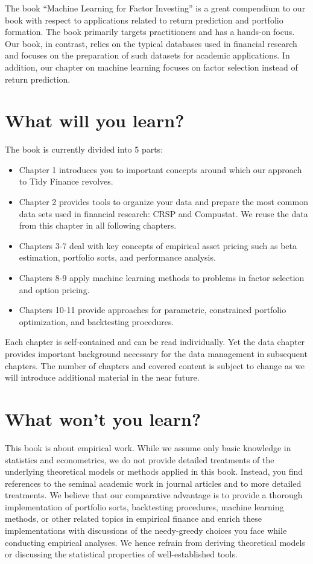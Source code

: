 \documentclass[
]{krantz}
\providecommand{\tightlist}{%
  \setlength{\itemsep}{0pt}\setlength{\parskip}{0pt}}
\begin{document}
The book ``Machine Learning for Factor Investing'' is a great compendium to our book with respect to applications related to return prediction and portfolio formation. The book primarily targets practitioners and has a hands-on focus. Our book, in contrast, relies on the typical databases used in financial research and focuses on the preparation of such datasets for academic applications. In addition, our chapter on machine learning focuses on factor selection instead of return prediction.

\hypertarget{what-will-you-learn}{%
\section*{What will you learn?}\label{what-will-you-learn}}


The book is currently divided into 5 parts:

\begin{itemize}
\tightlist
\item
  Chapter 1 introduces you to important concepts around which our approach to Tidy Finance revolves.
\item
  Chapter 2 provides tools to organize your data and prepare the most common data sets used in financial research: CRSP and Compustat. We reuse the data from this chapter in all following chapters.
\item
  Chapters 3-7 deal with key concepts of empirical asset pricing such as beta estimation, portfolio sorts, and performance analysis.
\item
  Chapters 8-9 apply machine learning methods to problems in factor selection and option pricing.
\item
  Chapters 10-11 provide approaches for parametric, constrained portfolio optimization, and backtesting procedures.
\end{itemize}

Each chapter is self-contained and can be read individually. Yet the data chapter provides important background necessary for the data management in subsequent chapters. The number of chapters and covered content is subject to change as we will introduce additional material in the near future.

\hypertarget{what-wont-you-learn}{%
\section*{What won't you learn?}\label{what-wont-you-learn}}


This book is about empirical work. While we assume only basic knowledge in statistics and econometrics, we do not provide detailed treatments of the underlying theoretical models or methods applied in this book. Instead, you find references to the seminal academic work in journal articles and to more detailed treatments.
We believe that our comparative advantage is to provide a thorough implementation of portfolio sorts, backtesting procedures, machine learning methods, or other related topics in empirical finance and enrich these implementations with discussions of the needy-greedy choices you face while conducting empirical analyses. We hence refrain from deriving theoretical models or discussing the statistical properties of well-established tools.
\end{document}
